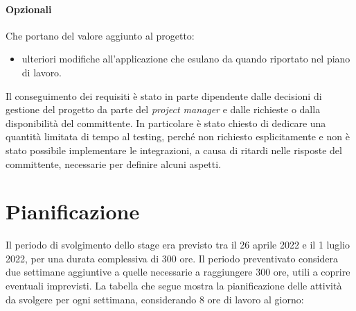 \paragraph{Opzionali} Che portano del valore aggiunto al progetto:
\begin{itemize}
	\item ulteriori modifiche all'applicazione che esulano da quando riportato nel piano di lavoro.
\end{itemize}

\noindent Il conseguimento dei requisiti è stato in parte dipendente dalle decisioni di gestione del progetto da parte del \emph{project manager} e dalle richieste o dalla disponibilità del committente. In particolare è stato chiesto di dedicare una quantità limitata di tempo al testing, perché non richiesto esplicitamente e non è stato possibile implementare le integrazioni, a causa di ritardi nelle risposte del committente, necessarie per definire alcuni aspetti.


\section{Pianificazione}
Il periodo di svolgimento dello stage era previsto tra il 26 aprile 2022 e il 1 luglio 2022, per una durata complessiva di 300 ore. Il periodo preventivato considera due settimane aggiuntive a quelle necessarie a raggiungere 300 ore, utili a coprire eventuali imprevisti. La tabella che segue mostra la pianificazione delle attività da svolgere per ogni settimana, considerando 8 ore di lavoro al giorno:

